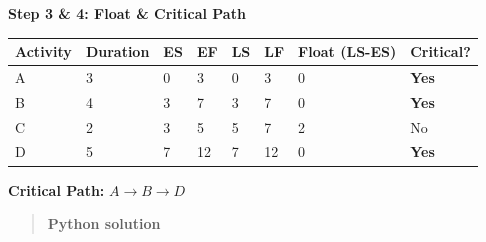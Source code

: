 \documentclass[
  letterpaper,
  DIV=11,
  numbers=noendperiod]{scrreprt}
\begin{document}
\textbf{Step 3 \& 4: Float \& Critical Path}

\begin{longtable}[]{@{}llllllll@{}}
\toprule\noalign{}
Activity & Duration & ES & EF & LS & LF & Float (LS-ES) & Critical? \\
\midrule\noalign{}
\endhead
\bottomrule\noalign{}
\endlastfoot
A & 3 & 0 & 3 & 0 & 3 & 0 & \textbf{Yes} \\
B & 4 & 3 & 7 & 3 & 7 & 0 & \textbf{Yes} \\
C & 2 & 3 & 5 & 5 & 7 & 2 & No \\
D & 5 & 7 & 12 & 7 & 12 & 0 & \textbf{Yes} \\
\end{longtable}

\textbf{Critical Path:} \(A \to B \to D\)

\begin{quote}
\textbf{Python solution}
\end{quote}
\end{document}
